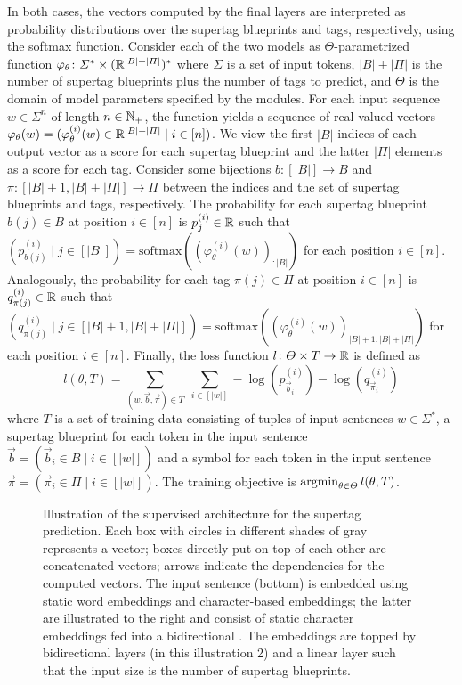 \documentclass[../../document.tex]{subfiles}
\begin{document}
    In both cases, the vectors computed by the final layers are interpreted as probability distributions over the supertag blueprints and  tags, respectively, using the softmax function.
    Consider each of the two models as \(\varTheta\)-parametrized function \(\varphi_\theta\colon \varSigma^* \times (\mathbb{R}^{|B|+|\varPi|})^*\) where \(\varSigma\) is a set of input tokens, \(|B|+|\varPi|\) is the number of supertag blueprints plus the number of  tags to predict, and \(\varTheta\) is the domain of model parameters specified by the modules.
    For each input sequence \(w \in \varSigma^n\) of length \(n \in \mathbb{N}_+\), the function yields a sequence of real-valued vectors \(\varphi_\theta(w) = (\varphi^{(i)}_\theta(w) \in \mathbb{R}^{|B|+|\varPi|} \mid i \in [n])\).
    We view the first \(|B|\) indices of each output vector as a score for each supertag blueprint and the latter \(|\varPi|\) elements as a score for each  tag.
    Consider some bijections \(b\colon [|B|] \to B\) and \(\pi\colon [|B|+1, |B|+|\varPi|] \to \varPi\) between the indices and the set of supertag blueprints and  tags, respectively.
    The probability for each supertag blueprint \(b(j) \in B\) at position \(i \in [n]\) is \(p_j^{(i)} \in \mathbb{R}\) such that \((p_{b(j)}^{(i)} \mid j \in [|B|]) = \mathrm{softmax}((\varphi^{(i)}_\theta(w))_{:|B|})\) for each position \(i\in [n]\).
    Analogously, the probability for each  tag \(\pi(j) \in \varPi\) at position \(i \in [n]\) is \(q_{\pi(j)}^{(i)} \in \mathbb{R}\) such that \((q_{\pi(j)}^{(i)} \mid j \in [|B|+1, |B|+|\varPi|]) = \mathrm{softmax}((\varphi^{(i)}_\theta(w))_{|B|+1:|B|+|\varPi|})\) for each position \(i\in [n]\).
    Finally, the loss function \(l\colon \varTheta \times T \to \mathbb{R}\) is defined as \[
        l(\theta, T) = \sum_{(w, \vec{b}, \vec{\pi}) \in T} \; \sum_{i \in [|w|]} - \log(p_{\vec{b}_i}^{(i)}) - \log(q_{\vec{\pi}_i}^{(i)})
    \]
    where \(T\) is a set of training data consisting of tuples of input sentences \(w \in \varSigma^*\), a supertag blueprint for each token in the input sentence \(\vec{b} = (\vec{b}_i \in B \mid i \in [|w|])\) and a  symbol for each token in the input sentence \(\vec{\pi} = (\vec{\pi}_i \in \varPi \mid i \in [|w|])\).
    The training objective is \(\operatorname{arg min}_{\theta \in \varTheta} l(\theta, T)\).

    \begin{figure}
        \centering
        
        \caption{\label{fig:architecture:supervised}
            Illustration of the supervised  architecture for the supertag prediction.
            Each box with circles in different shades of gray represents a vector; boxes directly put on top of each other are concatenated vectors; arrows indicate the dependencies for the computed vectors.
            The input sentence (bottom) is embedded using static word embeddings and character-based embeddings; the latter are illustrated to the right and consist of static character embeddings fed into a bidirectional .
            The embeddings are topped by bidirectional  layers (in this illustration 2) and a linear layer such that the input size is the number of supertag blueprints.
        }
    \end{figure}
\end{document}
